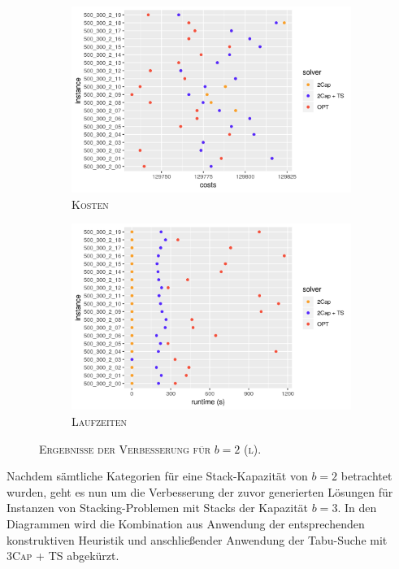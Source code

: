 \begin{figure}[H]
\centering
\begin{subfigure}[b]{0.47\textwidth}
\includegraphics[width=1.1\textwidth]{img/imp_b=2_l_costs.png}
\caption{\textsc{Kosten}}
\label{fig:imp_b=2_l_costs}
\end{subfigure}
\hfill
\begin{subfigure}[b]{0.47\textwidth}
\includegraphics[width=1.1\textwidth]{img/imp_b=2_l_runtimes.png}
\caption{\textsc{Laufzeiten}}
\label{fig:imp_b=2_l_runtimes}
\end{subfigure}
\caption{\textsc{Ergebnisse der Verbesserung für $b = 2$ (l)}.}
\label{fig:imp_res_b=2_l}
\end{figure}

Nachdem sämtliche Kategorien für eine Stack-Kapazität von $b = 2$ betrachtet wurden,
geht es nun um die Verbesserung der zuvor generierten Lösungen für Instanzen von Stacking-Problemen
mit Stacks der Kapazität $b = 3$. In den Diagrammen wird die Kombination aus Anwendung der entsprechenden konstruktiven Heuristik und anschließender Anwendung der Tabu-Suche mit \textsc{3Cap + TS} abgekürzt.

